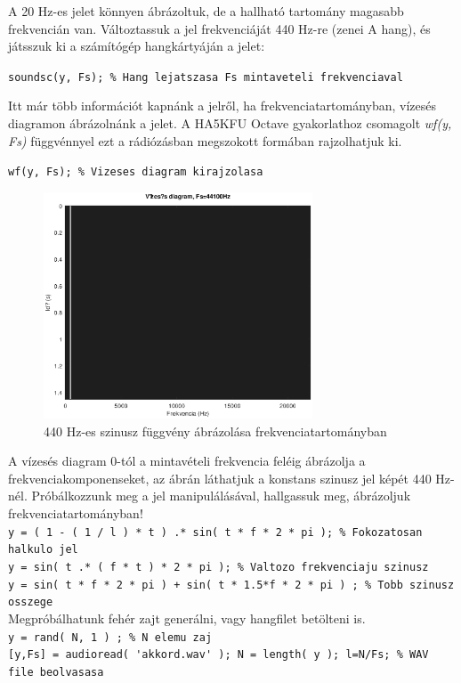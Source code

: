 \documentclass[12pt,a4paper]{article}
\begin{document}
A 20 Hz-es jelet könnyen ábrázoltuk, de a hallható tartomány magasabb frekvencián van. Változtassuk a jel frekvenciáját 440 Hz-re (zenei A hang), és játsszuk ki a számítógép hangkártyáján a jelet:

\lstinline{soundsc(y, Fs); % Hang lejatszasa Fs mintaveteli frekvenciaval } 


Itt már több információt kapnánk a jelről, ha frekvenciatartományban, vízesés diagramon ábrázolnánk a jelet. A HA5KFU Octave gyakorlathoz csomagolt \textit{wf(y, Fs)} függvénnyel ezt a rádiózásban megszokott formában rajzolhatjuk ki. 

\lstinline{wf(y, Fs); % Vizeses diagram kirajzolasa }  

\begin{figure}[H]
\begin{center}
\includegraphics[width=8cm]{figures/modulaciok_workshop_waterfall.eps}
\caption{440 Hz-es szinusz függvény ábrázolása frekvenciatartományban}
\label{fig:waterfall}
\end{center}
\end{figure}

A vízesés diagram 0-tól a mintavételi frekvencia feléig ábrázolja a frekvenciakomponenseket, az ábrán láthatjuk a konstans szinusz jel képét 440 Hz-nél. Próbálkozzunk meg a jel manipulálásával, hallgassuk meg, ábrázoljuk frekvenciatartományban!\\
\lstinline{y = ( 1 - ( 1 / l ) * t ) .* sin( t * f * 2 * pi ); % Fokozatosan halkulo jel } \\
\lstinline{y = sin( t .* ( f * t ) * 2 * pi ); % Valtozo frekvenciaju szinusz } \\
\lstinline{y = sin( t * f * 2 * pi ) + sin( t * 1.5*f * 2 * pi ) ; % Tobb szinusz osszege }
\\
Megpróbálhatunk fehér zajt generálni, vagy hangfilet betölteni is. \\
\lstinline{y = rand( N, 1 ) ; % N elemu zaj}  \\
\lstinline{[y,Fs] = audioread( 'akkord.wav' ); N = length( y ); l=N/Fs; % WAV file beolvasasa}
\end{document}
